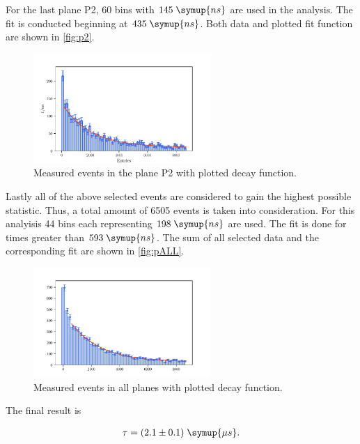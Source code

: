For the last plane P2, 60 bins with $145\;\symup{ns}$ are used in the analysis. The fit is conducted 
beginning at $435\;\symup{ns}$. Both data and plotted fit function are shown in \autoref{fig:p2}.\\

\begin{figure}
    \centering
    \includegraphics[width=0.6\textwidth]{plots/p2.pdf}
    \caption{Measured events in the plane P2 with plotted decay function.}
    \label{fig:p2}
\end{figure}

Lastly all of the above selected events are considered to gain the highest possible statistic.
Thus, a total amount of 6505 events is taken into consideration. For this analyisis 44 bins each 
representing $198\;\symup{ns}$ are used. The fit is done for times greater than $593\;\symup{ns}$.
The sum of all selected data and the corresponding fit are shown in \autoref{fig:pALL}.



\begin{figure}
    \centering
    \includegraphics[width=0.6\textwidth]{plots/pALL.pdf}
    \caption{Measured events in all planes with plotted decay function.}
    \label{fig:pALL}
\end{figure}

The final result is 

\begin{align*}
    \tau = (2.1 \pm 0.1) \; \symup{\mu s}.
\end{align*} 

